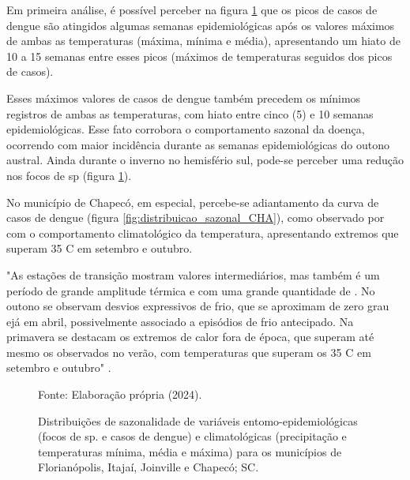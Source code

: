 \indent Em primeira análise, é possível perceber na figura \ref{fig:distribuicao_sazonal} que os picos de casos de dengue são atingidos algumas semanas epidemiológicas após os valores máximos de ambas as temperaturas (máxima, mínima e média), apresentando um hiato de 10 a 15 semanas entre esses picos (máximos de temperaturas seguidos dos picos de casos).

\indent Esses máximos valores de casos de dengue também precedem os mínimos registros de ambas as temperaturas, com hiato entre cinco (5) e 10 semanas epidemiológicas. Esse fato corrobora o comportamento sazonal da doença, ocorrendo com maior incidência durante as semanas epidemiológicas do outono austral. Ainda durante o inverno no hemisfério sul, pode-se perceber uma redução nos focos de  sp (figura \ref{fig:distribuicao_sazonal}).

\indent No município de Chapecó, em especial, percebe-se adiantamento da curva de casos de dengue (figura \ref{fig:distribuicao_sazonal_CHA}), como observado por  com o comportamento climatológico da temperatura, apresentando extremos que superam 35 C em setembro e outubro.

\begin{citacao}
"As estações de transição mostram valores intermediários, mas também é um período de grande amplitude térmica e com uma grande quantidade de . No outono se observam desvios expressivos de frio, que se aproximam de zero grau ejá em abril, possivelmente associado a episódios de frio antecipado. Na primavera se destacam os extremos de calor fora de época, que superam até mesmo os observados no verão, com temperaturas que superam os 35 C em setembro e outubro" \cite[pg-113]{Guerra2023Regionalizacao}.
\end{citacao}

\begin{figure}[htbp]
    \begin{center}
    \caption{Distribuições de sazonalidade de variáveis entomo-epidemiológicas (focos de  sp. e casos de dengue) e climatológicas (precipitação e temperaturas mínima, média e máxima) para os municípios de Florianópolis, Itajaí, Joinville e Chapecó; \acrlong{SC}.}
    \label{fig:distribuicao_sazonal}
    \hfill
    \hfill
    \end{center}
    \small{Fonte: Elaboração própria (2024).}
\end{figure}

